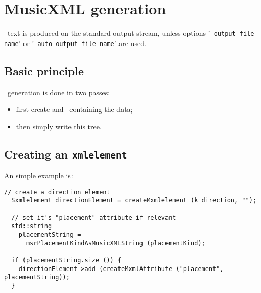 
\chapter{MusicXML generation}

\mxml\ text is produced on the standard output stream, unless options '{\tt -output-file-name}' or '{\tt -auto-output-file-name}' are used.


\section{Basic principle} \label{musicxmlGeneration}

\mxml\ generation is done in two passes:
\begin{itemize}
\item first create and \mxsrRepr\ containing the data;
\item then simply write this tree.
\end{itemize}


\section{Creating an {\tt xmlelement}}

An simple example is:
\begin{lstlisting}[language=CPlusPlus]
  // create a direction element
  Sxmlelement directionElement = createMxmlelement (k_direction, "");

  // set it's "placement" attribute if relevant
  std::string
    placementString =
      msrPlacementKindAsMusicXMLString (placementKind);

  if (placementString.size ()) {
    directionElement->add (createMxmlAttribute ("placement",  placementString));
  }
\end{lstlisting}

